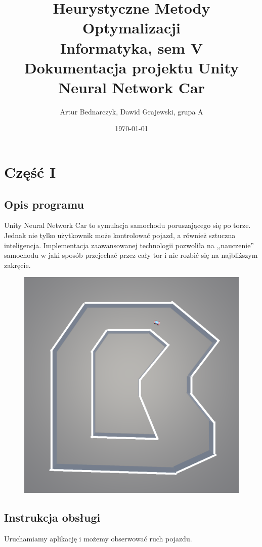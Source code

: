 \documentclass[12pt,a4paper]{article}
\begin{document}
	
	\title{Heurystyczne Metody Optymalizacji\\ Informatyka, sem V \\{Dokumentacja projektu Unity Neural Network Car}}
	\author{Artur Bednarczyk, Dawid Grajewski, grupa A}
	\date{\today}
	
	\maketitle
	\newpage
	\tableofcontents
	\newpage
	\section{Część I}
	\subsection{Opis programu}
	Unity Neural Network Car to symulacja samochodu poruszającego się po torze. Jednak nie tylko użytkownik może kontrolować pojazd, a również sztuczna inteligencja. Implementacja zaawansowanej technologii pozwoliła na ,,nauczenie'' samochodu w jaki sposób przejechać przez cały tor i nie rozbić się na najbliższym zakręcie.
	\begin{figure}[H]
	\includegraphics[scale=0.7]{car}
	\centering
	\end{figure}
	\subsection{Instrukcja obsługi}
	Uruchamiamy aplikację i możemy obserwować ruch pojazdu.
\end{document}
